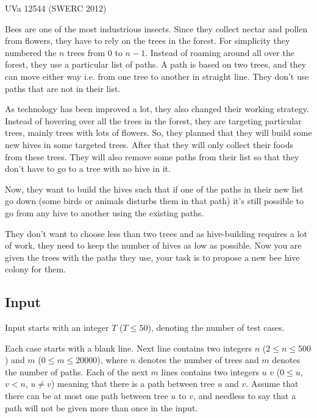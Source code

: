 

\noindent
UVa 12544 (SWERC 2012)\bigskip

Bees are one of the most industrious insects. Since they collect nectar and pollen from flowers, they have to rely on the trees in the forest. For simplicity they numbered the $n$ trees from $0$ to $n - 1$. Instead of roaming around all over the forest, they use a particular list of paths. A path is based on two trees, and they can move either way i.e. from one tree to another in straight line. They don't use paths that are not in their list.

As technology has been improved a lot, they also changed their working strategy. Instead of hovering over all the trees in the forest, they are targeting particular trees, mainly trees with lots of flowers. So, they planned that they will build some new hives in some targeted trees. After that they will only collect their foods from these trees. They will also remove some paths from their list so that they don't have to go to a tree with no hive in it.

Now, they want to build the hives such that if one of the paths in their new list go down (some birds or animals disturbs them in that path) it's still possible to go from any hive to another using the existing paths.

They don't want to choose less than two trees and as hive-building requires a lot of work, they need to keep the number of hives as low as possible. Now you are given the trees with the paths they use, your task is to propose a new bee hive colony for them.

\subsection*{Input}

Input starts with an integer $T$ ($T \leqslant 50$), denoting the number of test cases.

Each case starts with a blank line. Next line contains two integers $n$ ($2 \leqslant n \leqslant 500$) and $m$
($0 \leqslant m \leqslant 20000$), where $n$ denotes the number of trees and $m$ denotes the number of paths. Each of the next $m$ lines contains two integers $u$ $v$ ($0 \leqslant u$, $v < n$, $u \neq v$) meaning that there is a path between tree $u$ and $v$. Assume that there can be at most one path between tree $u$ to $v$, and needless to say that a path will not be given more than once in the input.

